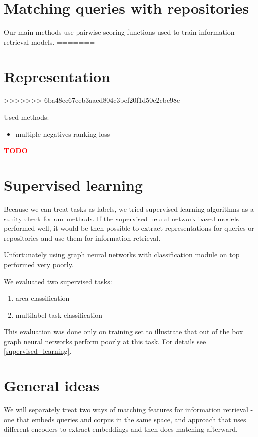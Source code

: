 \documentclass[longabstract,mgr,english]{iithesis}
\newcommand{\TODO}{\textcolor{red}{\huge{TODO}}}
\begin{document}
\section{Matching queries with repositories}

Our main methods use pairwise scoring functions used to train information retrieval models.
=======
\section{Representation}
>>>>>>> 6ba48ec67eeb3aaed804c3bef20f1d50e2cbe98e

Used methods:
\begin{itemize}
    \item multiple negatives ranking loss
\end{itemize}

\textbf{\textcolor{red}{\TODO}}


\section{Supervised learning}

Because we can treat tasks as labels, we tried supervised learning
algorithms as a sanity check for our methods. If the supervised neural network
based models performed
well, it would be then possible to extract representations for queries or
repositories and use them for information retrieval.

Unfortunately using graph neural networks with classification module
on top performed very poorly.

We evaluated two supervised tasks:

\begin{enumerate}
\item area classification
\item multilabel task classification
\end{enumerate}

This evaluation was done only on training set to illustrate that out of the box
graph neural networks perform poorly at this task. For details see \ref{supervised_learning}.

\section{General ideas}

We will separately treat two ways of matching features for information retrieval
- one that embeds queries and corpus in the same space, and approach that uses
different encoders to extract embeddings and then does matching afterward.
\end{document}
